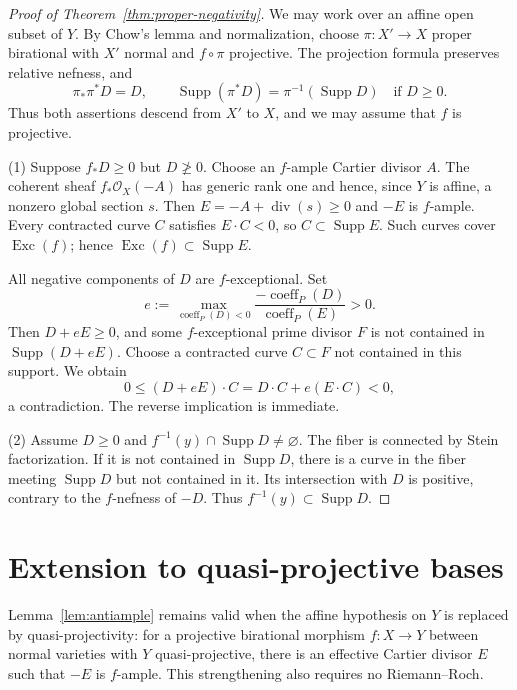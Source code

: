 \documentclass[12pt,a4paper,psamsfonts]{amsart}
\theoremstyle{plain}
\theoremstyle{definition}
\newcommand{\OO}{\mathcal O}
\DeclareMathOperator{\Supp}{Supp}
\DeclareMathOperator{\coeff}{coeff}
\begin{document}
\begin{proof}[Proof of Theorem~\ref{thm:proper-negativity}]
We may work over an affine open subset of $Y$. By Chow's lemma
and normalization, choose $\pi\colon X'\to X$ proper birational
with $X'$ normal and $f\circ\pi$ projective. The projection formula
preserves relative nefness, and
\[
\pi_*\pi^*D=D,\qquad
\Supp(\pi^*D)=\pi^{-1}(\Supp D)\quad\text{if }D\geq0.
\]
Thus both assertions descend from $X'$ to $X$, and we may assume
that $f$ is projective.

\textup{(1)} Suppose $f_*D\geq0$ but $D\not\geq0$.
Choose an $f$-ample Cartier divisor $A$. The coherent sheaf
$f_*\OO_X(-A)$ has generic rank one and hence, since $Y$ is affine,
a nonzero global section $s$. Then $E=-A+\operatorname{div}(s)\geq0$
and $-E$ is $f$-ample. Every contracted curve $C$ satisfies
$E\cdot C<0$, so $C\subset\Supp E$. Such curves cover
$\operatorname{Exc}(f)$; hence $\operatorname{Exc}(f)\subset\Supp E$.

All negative components of $D$ are $f$-exceptional. Set
\[
e:=\max_{\coeff_P(D)<0}
\frac{-\coeff_P(D)}{\coeff_P(E)}>0.
\]
Then $D+eE\geq0$, and some $f$-exceptional prime divisor $F$ is
not contained in $\Supp(D+eE)$. Choose a contracted curve
$C\subset F$ not contained in this support. We obtain
\[
0\leq(D+eE)\cdot C=D\cdot C+e(E\cdot C)<0,
\]
a contradiction. The reverse implication is immediate.

\textup{(2)} Assume $D\geq0$ and
$f^{-1}(y)\cap\Supp D\neq\varnothing$. The fiber is connected by
Stein factorization. If it is not contained in $\Supp D$, there is
a curve in the fiber meeting $\Supp D$ but not contained in it.
Its intersection with $D$ is positive, contrary to the
$f$-nefness of $-D$. Thus $f^{-1}(y)\subset\Supp D$.
\end{proof}

\section{Extension to quasi-projective bases}

Lemma~\ref{lem:antiample} remains valid when the affine hypothesis
on $Y$ is replaced by quasi-pro\-jec\-tivity: for a projective birational
morphism $f\colon X\to Y$ between normal varieties with $Y$
quasi-projective, there is an effective Cartier divisor $E$ such
that $-E$ is $f$-ample. This strengthening also requires no
Riemann--Roch.
\end{document}
